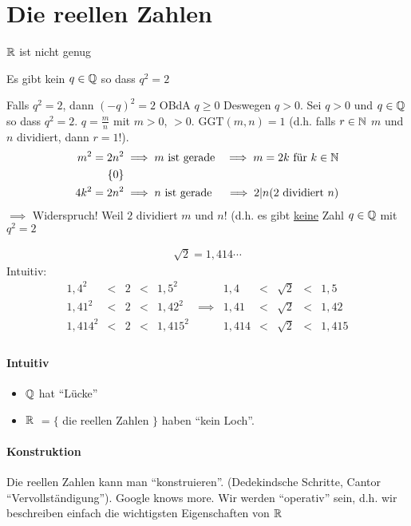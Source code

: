 \section{Die reellen Zahlen}
\begin{Bsp}
  $\mathbb{R}$ ist nicht genug
\end{Bsp}
\begin{Sat}
  Es gibt kein $q\in\mathbb{Q}$ so dass $q^2=2$
\end{Sat}
\begin{Bew}
  Falls $q^2=2$, dann $(-q)^2=2$ OBdA $q\geq 0$ Deswegen $q>0$. Sei $q>0$ und $q\in\mathbb{Q}$ so dass $q^2=2$. $q=\frac{m}{n}$ mit $m>0$, $>0$. $\text{GGT}(m,n)=1$ (d.h. falls $r\in\mathbb{N}$ $m$ und $n$ dividiert, dann $r=1$!).
  \begin{align*}
    m^2=2n^2&\implies m \text{ ist gerade}&\implies m=2k \text{ für } k\in\mathbb{N}\\\{0\}\\
    4k^2=2n^2&\implies n \text{ ist gerade}&\implies 2| n \text{(2 dividiert $n$)}
  \end{align*}
  $\implies$ Widerspruch! Weil $2$ dividiert $m$ und $n$! (d.h. es gibt \underline{keine} Zahl $q\in\mathbb{Q}$ mit $q^2=2$
\end{Bew}
\begin{Bsp}
  \begin{align*}
    \sqrt{2}=1,414\cdots
  \end{align*}
  Intuitiv:
  \begin{align*}
    1,4^2 & < & 2 & < & 1,5^2 & & 1,4 & < & \sqrt{2} & < & 1,5 \\
    1,41^2 & < & 2 & < & 1,42^2 & \implies & 1,41 & < & \sqrt{2} & < & 1,42 \\
    1,414^2 & < & 2 & < & 1,415^2 & & 1,414 & < & \sqrt{2} & < & 1,415 \\
  \end{align*}
\end{Bsp}
\paragraph{Intuitiv}
\begin{itemize}
  \item $\mathbb{Q}$ hat ``Lücke''
  \item $\mathbb{R}$ $= \{$ die reellen Zahlen $\}$ haben ``kein Loch''.
\end{itemize}
\paragraph{Konstruktion}
Die reellen Zahlen kann man ``konstruieren''. (Dedekindsche Schritte, Cantor ``Vervollständigung''). Google knows more. Wir werden ``operativ'' sein, d.h. wir beschreiben einfach die wichtigsten Eigenschaften von $\mathbb{R}$
